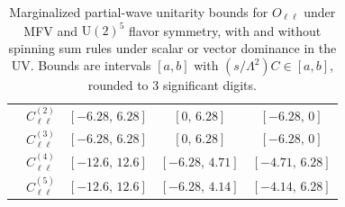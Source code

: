 \begin{table}[tbp]
{\begin{tabular}{ccccc}
        & $C_{\ell\ell}^{(2)}$ & $[-6.28,\, 6.28]$ & $[0,\, 6.28]$     & $[-6.28,\, 0]$    \\
        & $C_{\ell\ell}^{(3)}$ & $[-6.28,\, 6.28]$ & $[0,\, 6.28]$     & $[-6.28,\, 0]$    \\
        & $C_{\ell\ell}^{(4)}$ & $[-12.6,\, 12.6]$ & $[-6.28,\, 4.71]$ & $[-4.71,\, 6.28]$ \\
        & $C_{\ell\ell}^{(5)}$ & $[-12.6,\, 12.6]$ & $[-6.28,\, 4.14]$ & $[-4.14,\, 6.28]$ \\
    \bottomrule
\end{tabular}}
\caption{Marginalized partial-wave unitarity bounds for $O_{\ell\ell}$ under MFV and $\mathrm{U}(2)^5$
flavor symmetry, with and without spinning sum rules under scalar or vector dominance in the UV.
Bounds are intervals $[a,b]$ with $(s/\Lambda^2)C \in [a,b]$, rounded to 3 significant digits.}
\label{tab:Oll_UB}
\end{table}


